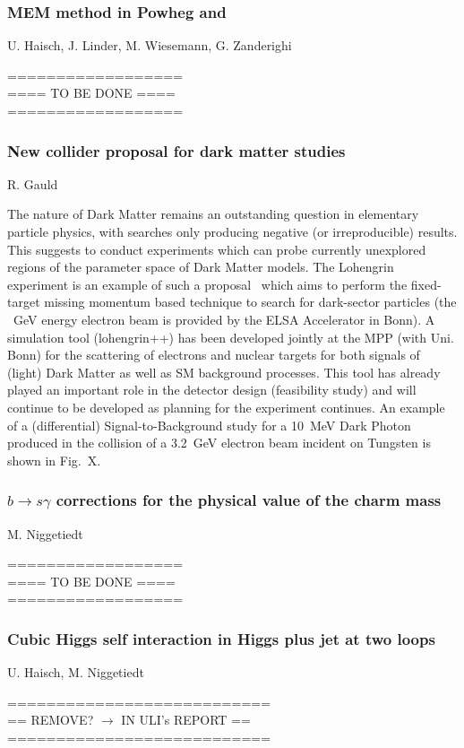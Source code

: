 \documentclass{FBR_Bericht_2025}
\begin{document}
\begin{refsection}
\subsubsection{MEM method in Powheg and \minnlo{}}
\begin{Namen}
U. Haisch, J. Linder, M. Wiesemann, G. Zanderighi
\end{Namen}
%
{\color{red} ==================\\ ====\; TO BE DONE\; ====\\ ==================}
%
\subsubsection{New collider proposal for dark matter studies}
\begin{Namen}
R. Gauld
\end{Namen}
The nature of Dark Matter remains an outstanding question in elementary particle physics, with searches only producing negative (or irreproducible) results.
This suggests to conduct experiments which can probe currently unexplored regions of the parameter space of Dark Matter models.
The Lohengrin experiment is an example of such a proposal~\cite{Bechtle:2024atq} which aims to perform the fixed-target missing momentum based technique to search for dark-sector particles (the ~GeV energy electron beam is provided by the ELSA Accelerator in Bonn).
A simulation tool (lohengrin++) has been developed jointly at the MPP (with Uni. Bonn) for the scattering of electrons and nuclear targets for both signals of (light) Dark Matter as well as SM background processes. This tool has already played an important role in the detector design (feasibility study) and will continue to be developed as planning for the experiment continues. An example of a (differential) Signal-to-Background study for a 10~MeV Dark Photon produced in the collision of a 3.2~GeV electron beam incident on Tungsten is shown in Fig.~{X}.
%
\subsubsection{$b\rightarrow s \gamma$ corrections for the physical value of the charm mass}
\begin{Namen}
M. Niggetiedt
\end{Namen}
%
{\color{red} ==================\\ ====\; TO BE DONE\; ====\\ ==================}
%
\subsubsection{Cubic Higgs self interaction in Higgs plus jet at two loops}
\begin{Namen}
U. Haisch, M. Niggetiedt
\end{Namen}
%
{\color{red} ===========================\\ ==\; REMOVE? $\rightarrow$ IN ULI's REPORT\; ==\\ ===========================}
%
\printbibliography[heading=subbibliography]
\end{refsection}


\clearpage
\onecolumn
\end{document}

